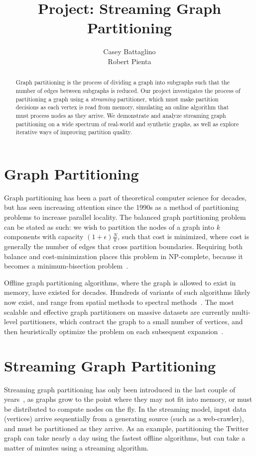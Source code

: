 \documentclass[11pt]{article}
\title{Project: Streaming Graph Partitioning}
\author{Casey Battaglino\\Robert Pienta}
\begin{document}
\maketitle

\begin{abstract}
Graph partitioning is the process of dividing a graph into subgraphs such that the number of edges between subgraphs is reduced. Our project investigates the process of partitioning a graph using a \emph{streaming} partitioner, which must make partition decisions as each vertex is read from memory, simulating an online algorithm that must process nodes as they arrive. We demonstrate and analyze streaming graph partitioning on a wide spectrum of real-world and synthetic graphs, as well as explore iterative ways of improving partition quality. 
\end{abstract}

\section{Graph Partitioning} \vspace{-10 pt}
Graph partitioning has been a part of theoretical computer science for decades, but has seen increasing attention since the 1990s as a method of partitioning problems to increase parallel locality. The balanced graph partitioning problem can be stated as such: we wish to partition the nodes of a graph into $k$ components with capacity $(1+\epsilon)\frac{N}{k}$, such that cost is minimized, where cost is generally the number of edges that cross partition boundaries. Requiring both balance and cost-minimization places this problem in NP-complete, because it becomes a minimum-bisection problem~\cite{Garey:1979:CIG:578533}.

Offline graph partitioning algorithms, where the graph is allowed to exist in memory, have existed for decades. Hundreds of variants of such algorithms likely now exist, and range from spatial methods to spectral methods~\cite{arora2009expander}. The most scalable and effective graph partitioners on massive datasets are currently multi-level partitioners, which contract the graph to a small number of vertices, and then heuristically optimize the problem on each subsequent expansion~\cite{karypis1998multilevel}. 

\section{Streaming Graph Partitioning}\vspace{-10 pt}
Streaming graph partitioning has only been introduced in the last couple of years~\cite{DBLP:journals/corr/abs-1212-1121,Stanton:2012:SGP:2339530.2339722,tsourakakis2012fennel}, as graphs grow to the point where they may not fit into memory, or must be distributed to compute nodes on the fly. In the streaming model, input data (vertices) arrive sequentially from a generating source (such as a web-crawler), and must be partitioned as they arrive. As an example, partitioning the Twitter graph can take nearly a day using the fastest offline algorithms, but can take a matter of minutes using a streaming algorithm.
\end{document}
